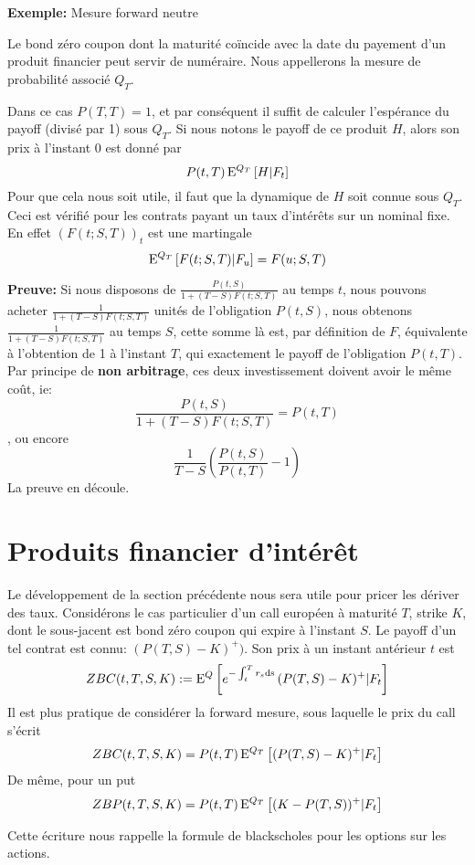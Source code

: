\textbf{Exemple:} Mesure forward neutre

Le bond zéro coupon dont la maturité coïncide avec la date du payement d'un produit financier peut servir de numéraire. Nous appellerons la mesure de probabilité associé $Q_T$.

Dans ce cas $P(T, T) = 1$, et par conséquent il suffit de calculer l'espérance du payoff (divisé par 1) sous $Q_T$.
Si nous notons le payoff de ce produit $H$, alors son prix à l'instant $0$ est donné par $$P(t, T) \, \mathrm{E}^{Q_T} \left[  H | F_t  \right] $$
Pour que cela nous soit utile, il faut que la dynamique de $H$ soit connue sous $Q_T$. Ceci est vérifié pour les contrats payant un taux d'intérêts sur un nominal fixe. En effet $(F(t; S, T))_t$ est une martingale 
$$ \mathrm{E}^{Q_T} \left[  F(t; S, T) | F_u  \right] = F(u; S, T)$$

\textbf{Preuve:}
Si nous disposons de  $\frac{P(t, S)}{1+(T-S)F(t; S, T)}$ au temps $t$, nous pouvons acheter $\frac{1}{1+(T-S)F(t; S, T)}$ unités de l'obligation $P(t, S)$, nous obtenons $\frac{1}{1+(T-S)F(t; S, T)}$ au temps $S$, cette somme là est, par définition de $F$, équivalente à l'obtention de 1 à l'instant $T$, qui exactement le payoff de l'obligation $P(t, T)$.
Par principe de \textbf{non arbitrage}, ces deux investissement doivent avoir le même coût, ie: $$\frac{P(t, S)}{1+(T-S)F(t;S,T)} = P(t, T)$$, ou encore
$$ \frac{1}{T-S} \left( \frac{P(t, S)}{P(t, T)} - 1  \right) $$
La preuve en découle.

\newpage

\section{Produits financier d'intérêt}

Le développement de la section précédente nous sera utile pour pricer les dériver des taux.
Considérons le cas particulier d'un call européen à maturité $T$, strike $K$, dont le sous-jacent est bond zéro coupon qui expire à l'instant $S$. Le payoff d'un tel contrat est connu: $ (P(T, S) - K)^+)$. Son prix à un instant antérieur $t$ est
$$ZBC(t, T, S, K) := \mathrm{E}^Q \left[  e^{-\int_t^T r_s \rm{d}s} \, (P(T, S) - K)^+ | F_t  \right]$$
Il est plus pratique de considérer la forward mesure, sous laquelle le prix du call s'écrit
$$ZBC(t, T, S, K) = P(t, T) \, \mathrm{E}^{Q_T} \left[ (P(T, S) - K)^+ | F_t \right]$$
De même, pour un put
$$ZBP(t, T, S, K) = P(t, T) \, \mathrm{E}^{Q_T} \left[ (K - P(T, S))^+ | F_t \right]$$

Cette écriture nous rappelle la formule de blackscholes pour les options sur les actions.

